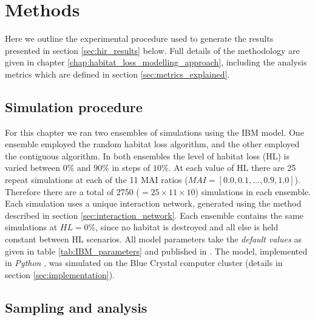

\section{Methods}
\label{sec:methods_hi}

Here we outline the experimental procedure used to generate the results presented in section \ref{sec:hir_results} below. Full details of the methodology are given in chapter \ref{chap:habitat_loss_modelling_approach}, including the analysis metrics which are defined in section \ref{sec:metrics_explained}. 

\subsection{Simulation procedure}
\label{sec:simulation_procedure}

For this chapter we ran two ensembles of simulations using the IBM model. One ensemble employed the random habitat loss algorithm, and the other employed the contiguous algorithm. In both ensembles the level of habitat loss (HL) is varied between $0\%$ and $90\%$ in steps of $10\%$. At each value of HL there are 25 repeat simulations at each of the 11 MAI ratios ($MAI=[0.0,0.1,...,0.9,1.0]$). Therefore there are a total of 2750 ($=25 \times 11 \times 10$) simulations in each ensemble. Each simulation uses a unique interaction network, generated using the method described in section \ref{sec:interaction_network}. Each ensemble contains the same simulations at $HL=0\%$, since no habitat is destroyed and all else is held constant between HL scenarios. All model parameters take the \emph{default values} as given in table \ref{tab:IBM_parameters} and published in \cite{lurgi2015effects}. The model, implemented in \emph{Python} \cite{python}, was simulated on the Blue Crystal computer cluster \cite{BC3} (details in section \ref{sec:implementation}).


\subsection{Sampling and analysis}
\label{sec:sampling}

